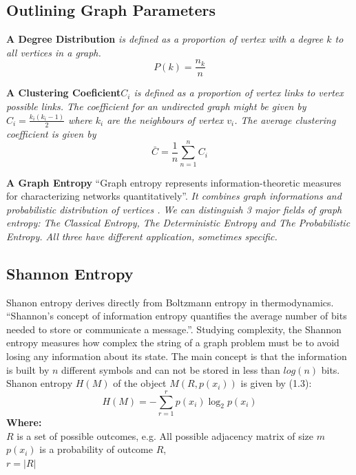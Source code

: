 \subsection{Outlining Graph Parameters}
\begin{definition}\textbf{A Degree Distribution} \emph{is defined as a proportion of vertex with a degree $k$ to all vertices in a graph.}
\begin{equation}
P(k) = \frac{n_k}{n}
\end{equation}
\end{definition}
\begin{definition}\textbf{A Clustering Coeficient}\emph{$C_i$ is defined as a proportion of vertex links to vertex possible links. The coefficient for an undirected graph might be given by $C_i = \frac{k_i(k_i-1)}{2}$ where $k_i$ are the neighbours of vertex $v_i$. The average clustering coefficient is given by}
\begin{equation}
\bar{C} = \frac{1}{n}\sum_{n = 1}^{n} C_i
\end{equation}
\end{definition}
\begin{definition}\textbf{A Graph Entropy} “Graph entropy represents information-theoretic measures for characterizing networks quantitatively”\cite{Dehmer}. \emph{It combines graph informations and probabilistic distribution of vertices \cite{Changiz}. We can distinguish 3 major fields of graph entropy: The Classical Entropy, The Deterministic Entropy and The Probabilistic Entropy. All three have different application, sometimes specific.}\end{definition}
\subsection{Shannon Entropy}
Shanon entropy derives directly from Boltzmann entropy in thermodynamics. “Shannon’s concept of information entropy quantifies the average number of bits needed to store or communicate a message.”\cite{Zenil}. Studying complexity, the Shannon entropy measures how complex the string of a graph problem must be to avoid losing any information about its state. The main concept is that the information is built by $n$ different symbols and can not be stored in less than $log(n)$ bits.
Shanon entropy $H(M)$ of the object $M(R, p(x_i))$ is given by (1.3)\cite{HeZeni}:
\begin{equation}
H(M) = - \sum_{r = 1}^{r} p(x_i)\log_2 p(x_i)
\end{equation}
\textbf{Where:}\\
$R$ is a set of possible outcomes, e.g.  All possible adjacency matrix of size $m$\\
$p(x_i)$ is a probability of outcome $R$,\\
$r= |R|$\\
